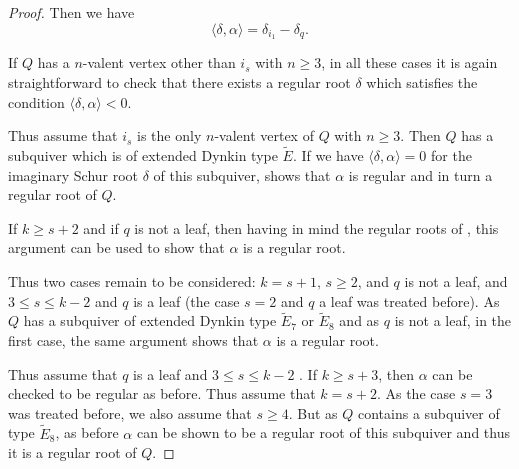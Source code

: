 \documentclass{amsart}
\newcommand{\sayT}[1]{\say[T]{#1}}
\numberwithin{equation}{section}
\newcommand{\Sc}[2]{\langle #1,#2\rangle}
\begin{document}
\begin{proof}

Then we have 
$$\Sc{\delta}{\alpha}=\delta_{i_1}-\delta_q.$$

If $Q$ has a $n$-valent vertex other than $i_s$ with $n\geq 3$, in all these cases it is again straightforward to check that there exists a regular root $\delta$ which satisfies the condition $\Sc{\delta}{\alpha}<0$. \sayT{double-check from here on}

Thus assume that $i_s$ is the only $n$-valent vertex of $Q$ with $n\geq 3$. Then $Q$ has a subquiver which is of extended Dynkin type $\tilde E$. If we have $\Sc{\delta}{\alpha}= 0$ for the imaginary Schur root $\delta$ of this subquiver, \cite[Section 7, Lemma 2]{CB} shows that $\alpha$ is regular and in turn a regular root of $Q$.

If $k\geq s+2$ and if $q$ is not a leaf, then having in mind the regular roots of \cite[Section 4]{CB}, this argument can be used to show that $\alpha$ is a regular root.

Thus two cases remain to be considered: $k=s+1,\,s\geq 2$, and $q$ is not a leaf, and $3\leq s\leq k-2$ and $q$ is a leaf (the case $s=2$ and $q$ a leaf was treated before). 
As $Q$ has a subquiver of extended Dynkin type $\tilde E_7$ or $\tilde E_8$ and as $q$ is not a leaf, in the first case, the same argument shows that $\alpha$ is a regular root.

Thus assume that $q$ is a leaf and $3\leq s\leq k-2$ . If $k\geq s+3$, then $\alpha$ can be checked to be regular as before. Thus assume that $k=s+2$. As the case $s=3$ was treated before, we also assume that $s\geq 4$. But as $Q$ contains a subquiver of type $\tilde E_8$, as before $\alpha$ can be shown to be a regular root of this subquiver and thus it is a regular root of $Q$.




\end{proof}
\end{document}

